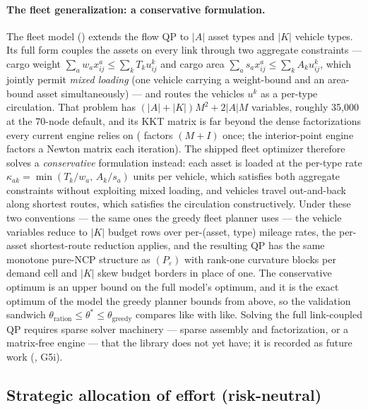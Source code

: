 \paragraph{The fleet generalization: a conservative formulation.} The
fleet model () extends the flow
QP to $|A|$ asset types and $|K|$ vehicle types. Its full form couples
the assets on every link through two aggregate constraints --- cargo
weight $\sum_a w_a x^a_{ij} \le \sum_k T_k u^k_{ij}$ and cargo area
$\sum_a s_a x^a_{ij} \le \sum_k A_k u^k_{ij}$, which jointly permit
\emph{mixed loading} (one vehicle carrying a weight-bound and an
area-bound asset simultaneously) --- and routes the vehicles $u^k$ as a
per-type circulation. That problem has $(|A| + |K|)M^2 + 2|A|M$
variables, roughly 35{,}000 at the 70-node default, and its KKT matrix
is far beyond the dense factorizations every current engine relies on
( factors $(M+I)$ once; the interior-point engine factors
a Newton matrix each iteration). The shipped fleet optimizer therefore
solves a \emph{conservative} formulation instead: each asset is loaded
at the per-type rate $\kappa_{ak} = \min(T_k/w_a,\, A_k/s_a)$ units per
vehicle, which satisfies both aggregate constraints without exploiting
mixed loading, and vehicles travel out-and-back along shortest routes,
which satisfies the circulation constructively. Under these two
conventions --- the same ones the greedy fleet planner uses --- the
vehicle variables reduce to $|K|$ budget rows over per-(asset, type)
mileage rates, the per-asset shortest-route reduction applies, and the
resulting QP has the same monotone pure-NCP structure as
$(P_\varepsilon)$ with rank-one curvature blocks per demand cell and
$|K|$ skew budget borders in place of one. The conservative optimum is
an upper bound on the full model's optimum, and it is the exact optimum
of the model the greedy planner bounds from above, so the validation
sandwich $\theta_{\text{ration}} \le \theta^\ast \le
\theta_{\text{greedy}}$ compares like with like. Solving the full
link-coupled QP requires sparse solver machinery --- sparse assembly and
factorization, or a matrix-free engine --- that the library does not yet
have; it is recorded as future work (, G5i).

\subsection{Strategic allocation of effort (risk-neutral)}
\label{sec:a-saoe}

